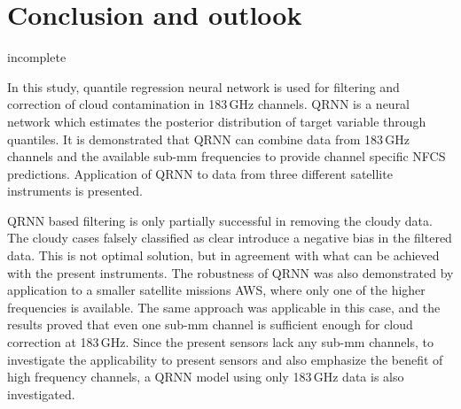 \documentclass[amt, manuscript]{copernicus}
\newcommand{\todo}[1]{{\color{red} #1}}
\begin{document}


\section{Conclusion and outlook}  %
%

\todo{incomplete}


In this study, quantile regression neural network is used for filtering and correction of cloud contamination in 183\,GHz channels. QRNN is a neural network which estimates the posterior distribution of target variable through quantiles. It is demonstrated that QRNN can combine data from 183\,GHz channels and the available sub-mm frequencies to provide channel specific NFCS predictions. Application of QRNN to data from three different satellite instruments is presented. 
 

QRNN based filtering is only partially successful in removing the cloudy data. The cloudy cases falsely classified as clear introduce a negative bias in the filtered data. This is not optimal solution, but in agreement with what can be achieved with the present instruments. The robustness of QRNN was also demonstrated by application to a smaller satellite missions AWS, where only one of the higher frequencies is available. The same approach was applicable in this case, and the results proved that even one sub-mm channel is sufficient enough for cloud correction at 183\,GHz. Since the present sensors lack any sub-mm channels, to investigate the applicability to present sensors and also emphasize the benefit of high frequency channels, a QRNN model using only 183\,GHz data is also investigated.  
\end{document}

